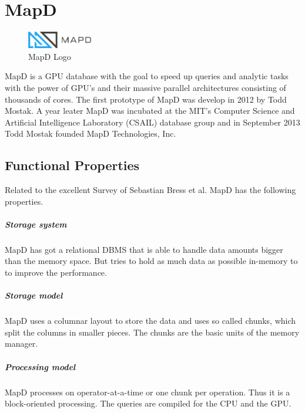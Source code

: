 \chapter{MapD}

\begin{figure}
  \begin{center}
    \includegraphics[width=80pt]{images/mapd_logo.png}
  \end{center}
  \caption[MapD]{MapD Logo}
\end{figure}


MapD is a GPU database with the goal to speed up queries and analytic tasks with the power of GPU's
and their massive parallel architectures consisting of thousands of cores.
The first prototype of MapD was develop in 2012 by Todd Mostak.
A year leater MapD was incubated at the  MIT’s Computer Science and Artificial Intelligence Laboratory (CSAIL) database group
and in September 2013 Todd Mostak founded MapD Technologies, Inc.

\section{Functional Properties}
Related to the excellent Survey of Sebastian Bress et al. \cite{bress2014gpu} MapD has the following properties.

\paragraph{Storage system} MapD has got a relational DBMS that is able to handle data amounts bigger than the memory space.
But tries to hold as much data as possible in-memory to to improve the performance.
\paragraph{Storage model} MapD uses a columnar layout to store the data and uses so called chunks, which split the columns in smaller pieces.
The chunks are the basic units of the memory manager.
\paragraph{Processing model} MapD processes on operator-at-a-time or one chunk per operation. Thus it is a block-oriented processing.
The queries are compiled for the CPU and the GPU.
